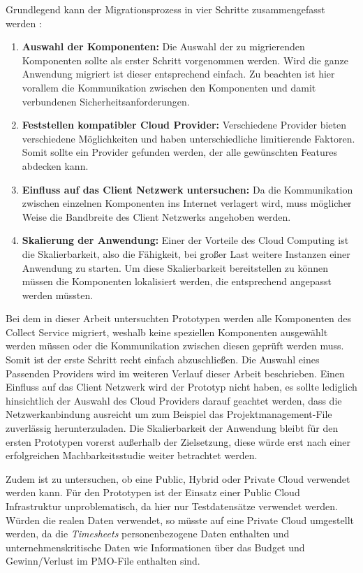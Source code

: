 Grundlegend kann der Migrationsprozess  in vier Schritte zusammengefasst werden \cite[Vgl. auch im Folgenden][S. 34f]{Maenhaut2016}:
\begin{enumerate}
\item \textbf{Auswahl der Komponenten:} Die Auswahl der zu migrierenden Komponenten sollte als erster Schritt vorgenommen werden. Wird die ganze Anwendung migriert ist dieser entsprechend einfach. Zu beachten ist hier vorallem die Kommunikation zwischen den Komponenten und damit verbundenen Sicherheitsanforderungen.
\item \textbf{Feststellen kompatibler Cloud Provider:} Verschiedene Provider bieten verschiedene Möglichkeiten und haben unterschiedliche limitierende Faktoren. Somit sollte ein Provider gefunden werden, der alle gewünschten Features abdecken kann.
\item \textbf{Einfluss auf das Client Netzwerk untersuchen:} Da die Kommunikation zwischen einzelnen Komponenten ins Internet verlagert wird, muss möglicher Weise die Bandbreite des Client Netzwerks angehoben werden.
\item \textbf{Skalierung der Anwendung:} Einer der Vorteile des Cloud Computing ist die Skalierbarkeit, also die Fähigkeit, bei großer Last weitere Instanzen einer Anwendung zu starten. Um diese Skalierbarkeit bereitstellen zu können müssen die Komponenten lokalisiert werden, die entsprechend angepasst werden müssten.
\end{enumerate}


Bei dem in dieser Arbeit untersuchten Prototypen werden alle Komponenten des Collect Service migriert, weshalb keine speziellen Komponenten ausgewählt werden müssen oder die Kommunikation zwischen diesen geprüft werden muss. Somit ist der erste Schritt recht einfach abzuschließen. Die Auswahl eines Passenden Providers wird im weiteren Verlauf dieser Arbeit beschrieben. Einen Einfluss auf das Client Netzwerk wird der Prototyp nicht haben, es sollte lediglich hinsichtlich der Auswahl des Cloud Providers darauf geachtet werden, dass die Netzwerkanbindung ausreicht um zum Beispiel das Projektmanagement-File zuverlässig herunterzuladen. Die Skalierbarkeit der Anwendung bleibt für den ersten Prototypen vorerst außerhalb der Zielsetzung, diese würde erst nach einer erfolgreichen Machbarkeitsstudie weiter betrachtet werden. \pagebreak

Zudem ist zu untersuchen, ob eine Public, Hybrid oder Private Cloud verwendet werden kann. Für den Prototypen ist der Einsatz einer Public Cloud Infrastruktur unproblematisch, da hier nur Testdatensätze verwendet werden. Würden die realen Daten verwendet, so müsste auf eine Private Cloud umgestellt werden, da die \textit{\glspl{Timesheet}} personenbezogene Daten enthalten und unternehmenskritische Daten wie Informationen über das Budget und Gewinn/Verlust im PMO-File enthalten sind.

